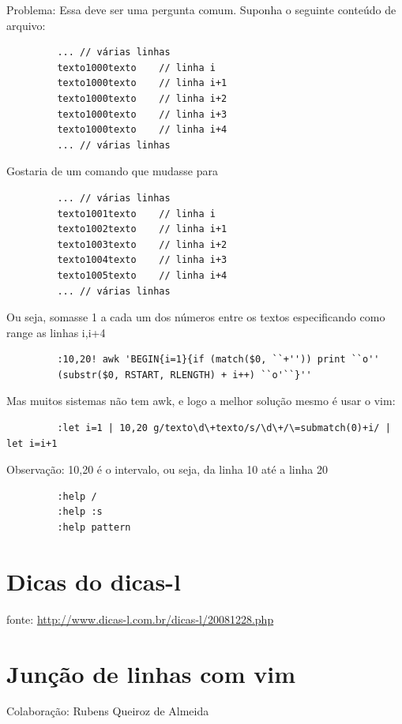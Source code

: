 \documentclass[10pt,a4paper,openany]{book}
\begin{document}
 Problema:
 Essa deve ser uma pergunta comum.
 Suponha o seguinte conteúdo de arquivo:

\begin{verbatim}
		 ... // várias linhas
		 texto1000texto    // linha i
		 texto1000texto    // linha i+1
		 texto1000texto    // linha i+2
		 texto1000texto    // linha i+3
		 texto1000texto    // linha i+4
		 ... // várias linhas
\end{verbatim}

Gostaria de um comando que mudasse para

\begin{verbatim}
		 ... // várias linhas
		 texto1001texto    // linha i
		 texto1002texto    // linha i+1
		 texto1003texto    // linha i+2
		 texto1004texto    // linha i+3
		 texto1005texto    // linha i+4
		 ... // várias linhas
\end{verbatim}

 Ou seja, somasse 1 a cada um dos números entre os textos
 especificando como range as linhas i,i+4

\begin{verbatim}
		 :10,20! awk 'BEGIN{i=1}{if (match($0, ``+'')) print ``o''
		 (substr($0, RSTART, RLENGTH) + i++) ``o'``}''
\end{verbatim}

 Mas muitos sistemas não tem awk, e logo a melhor solução mesmo é usar o vim:

\begin{verbatim}
		 :let i=1 | 10,20 g/texto\d\+texto/s/\d\+/\=submatch(0)+i/ | let i=i+1
\end{verbatim}

Observação: 10,20 é o intervalo, ou seja, da linha 10 até a linha 20

\begin{verbatim}
		 :help /
		 :help :s
		 :help pattern
\end{verbatim}

\section{Dicas do dicas-l}

fonte: \url{http://www.dicas-l.com.br/dicas-l/20081228.php}

\section{Junção de linhas com vim}
\label{Junção de linhas com vim}
Colaboração: Rubens Queiroz de Almeida
\end{document}
